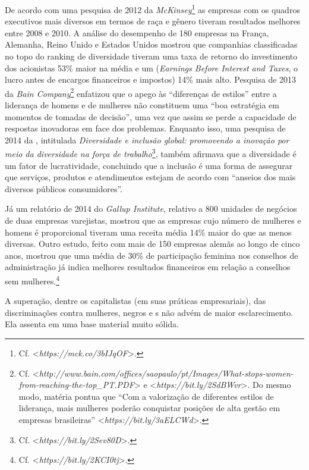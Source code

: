 De acordo com uma pesquisa de 2012 da \emph{McKinsey}\footnote{Cf.
  \textless{}\emph{https://mck.co/3bIJqOF}\textgreater{}.} as
empresas com os quadros executivos mais diversos em termos de raça e
gênero tiveram resultados melhores entre 2008 e 2010. A análise do
desempenho de 180 empresas na França, Alemanha, Reino Unido e Estados
Unidos mostrou que companhias classificadas no topo do ranking de
diversidade tiveram uma taxa de retorno do investimento dos acionistas
53\% maior na média e um  (\emph{Earnings Before Interest and
Taxes}, o lucro antes de encargos financeiros e impostos) 14\% mais
alto. Pesquisa de 2013 da \emph{Bain Company}\footnote{Cf.
  \textless{}\emph{http://www.bain.com/offices/saopaulo/pt/Images/What-stops-women-from-reaching-the-top\_PT.PDF}\textgreater{} %
  e
  \textless{}\emph{https://bit.ly/2SdBWvr}\textgreater{}.
  Do mesmo modo, matéria pontua que ``Com a valorização de diferentes
  estilos de liderança, mais mulheres poderão conquistar posições de
  alta gestão em empresas brasileiras''
  \textless{}\emph{https://bit.ly/3aELCWd}\textgreater{}.}
enfatizou que o apego às ``diferenças de estilos'' entre a liderança de
homens e de mulheres não constituem uma ``boa estratégia em momentos de
tomadas de decisão'', uma vez que assim se perde a capacidade de
respostas inovadoras em face dos problemas. Enquanto isso, uma pesquisa
de 2014 da , intitulada \emph{Diversidade e inclusão global:
promovendo a inovação por meio da diversidade na força de
trabalho}\footnote{Cf.
  \textless{}\emph{https://bit.ly/2Sev80D}\textgreater{}.},
também afirmava que a diversidade é um fator de lucratividade,
concluindo que a inclusão é uma forma de assegurar que serviços,
produtos e atendimentos estejam de acordo com ``anseios dos mais
diversos públicos consumidores''.

Já um relatório de 2014 do \emph{Gallup Institute}, relativo a 800
unidades de negócios de duas empresas varejistas, mostrou que as
empresas cujo número de mulheres e homens é proporcional tiveram uma
receita média 14\% maior do que as menos diversas. Outro estudo, feito
com mais de 150 empresas alemãs ao longo de cinco anos, mostrou que uma
média de 30\% de participação feminina nos conselhos de administração já
indica melhores resultados financeiros em relação a conselhos sem
mulheres.\footnote{Cf.
  \textless{}\emph{https://bit.ly/2KCI0tj}\textgreater{}.}

A superação, dentre os capitalistas (em suas práticas empresariais), das
discriminações contra mulheres, negros e s não advém de maior
esclarecimento. Ela assenta em uma base material muito sólida.


